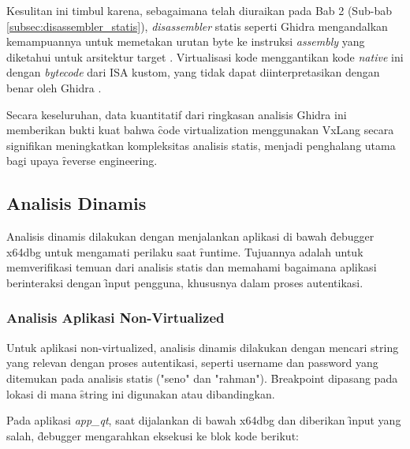 Kesulitan ini timbul karena, sebagaimana telah diuraikan pada Bab 2 (Sub-bab \ref{subsec:disassembler_statis}), \textit{disassembler} statis seperti Ghidra mengandalkan kemampuannya untuk memetakan urutan byte ke instruksi \textit{assembly} yang diketahui untuk arsitektur target \cite{Sikorski2012, Eilam2011}. Virtualisasi kode menggantikan kode \textit{native} ini dengan \textit{bytecode} dari ISA kustom, yang tidak dapat diinterpretasikan dengan benar oleh Ghidra \cite{Ko2007}. 

Secara keseluruhan, data kuantitatif dari ringkasan analisis Ghidra ini memberikan bukti kuat bahwa \f{code virtualization} menggunakan VxLang secara signifikan meningkatkan kompleksitas analisis statis, menjadi penghalang utama bagi upaya \f{reverse engineering}.

\subsection{Analisis Dinamis}
Analisis dinamis dilakukan dengan menjalankan aplikasi di bawah \f{debugger} x64dbg untuk mengamati perilaku saat \f{runtime}. Tujuannya adalah untuk memverifikasi temuan dari analisis statis dan memahami bagaimana aplikasi berinteraksi dengan \f{input} pengguna, khususnya dalam proses autentikasi.

\subsubsection{Analisis Aplikasi Non-Virtualized}

Untuk aplikasi non-virtualized, analisis dinamis dilakukan dengan mencari string yang relevan dengan proses autentikasi, seperti username dan password yang ditemukan pada analisis statis ("seno" dan "rahman"). \f{Breakpoint} dipasang pada lokasi di mana \f{string} ini digunakan atau dibandingkan.

Pada aplikasi \textit{app\_qt}, saat dijalankan di bawah x64dbg dan diberikan \f{input} yang salah, \f{debugger} mengarahkan eksekusi ke blok kode berikut:

